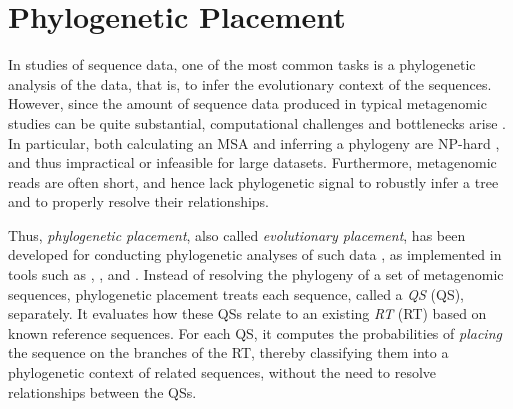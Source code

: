 
\section{Phylogenetic Placement}
\label{ch:Foundations:sec:PhylogeneticPlacement}

In studies of sequence data, one of the most common tasks is a phylogenetic analysis of the data,
that is, to infer the evolutionary context of the sequences.
However, since the amount of sequence data produced in typical metagenomic studies can be quite substantial,
computational challenges and bottlenecks arise \cite{Scholz2012}.
In particular, both calculating an MSA and inferring a phylogeny are NP-hard \cite{Just2001,Chor2005},
and thus impractical or infeasible for large datasets.
Furthermore, metagenomic reads are often short, and hence lack phylogenetic signal
to robustly infer a tree and to properly resolve their relationships.

Thus, \emph{phylogenetic placement}, also called \emph{evolutionary placement},
has been developed for conducting phylogenetic analyses of such data \cite{VonMering2007,Monier2008},
as implemented in tools such as
 \cite{Matsen2010},  \cite{Berger2011}, and  \cite{Barbera2018}.
Instead of resolving the phylogeny of a set of metagenomic sequences,
phylogenetic placement treats each sequence, called a \emph{\acl{QS}} (\acs{QS}), separately.
It evaluates how these \acp{QS} relate to an existing \emph{\acl{RT}} (\acs{RT}) based on known reference sequences.
For each \ac{QS}, it computes the probabilities of \emph{placing} the sequence on the branches of the \ac{RT},
thereby classifying them into a phylogenetic context of related sequences,
without the need to resolve relationships between the \acp{QS}.


